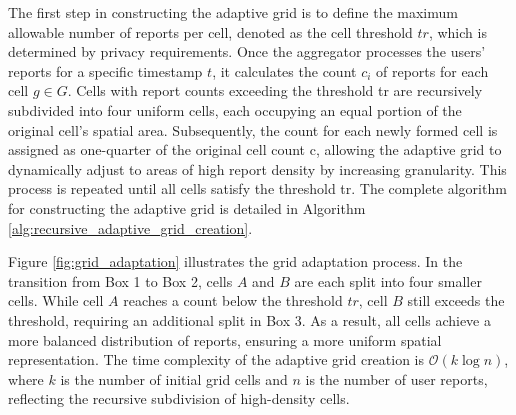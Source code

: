 The first step in constructing the adaptive grid is to define the maximum allowable number of reports per cell, denoted as the cell threshold $tr$, which is determined by privacy requirements. Once the aggregator processes the users' reports for a specific timestamp $t$, it calculates the count $c_i$ of reports for each cell $g \in G$. Cells with report counts exceeding the threshold tr are recursively subdivided into four uniform cells, each occupying an equal portion of the original cell's spatial area. Subsequently, the count for each newly formed cell is assigned as one-quarter of the original cell count c, allowing the adaptive grid to dynamically adjust to areas of high report density by increasing granularity. This process is repeated until all cells satisfy the threshold tr. The complete algorithm for constructing the adaptive grid is detailed in Algorithm \ref{alg:recursive_adaptive_grid_creation}.

\begin{algorithm}[htb]
\small
{}
\SetAlgoNoLine



\caption{Adaptive Grid Creation Algorithm}
\label{alg:recursive_adaptive_grid_creation}
\end{algorithm}
% 
Figure \ref{fig:grid_adaptation} illustrates the grid adaptation process. In the transition from Box 1 to Box 2, cells $A$ and $B$ are each split into four smaller cells. While cell $A$ reaches a count below the threshold $tr$, cell $B$ still exceeds the threshold, requiring an additional split in Box 3. As a result, all cells achieve a more balanced distribution of reports, ensuring a more uniform spatial representation. The time complexity of the adaptive grid creation is $\mathcal{O}(k \log n)$, where $k$ is the number of initial grid cells and $n$ is the number of user reports, reflecting the recursive subdivision of high-density cells.


